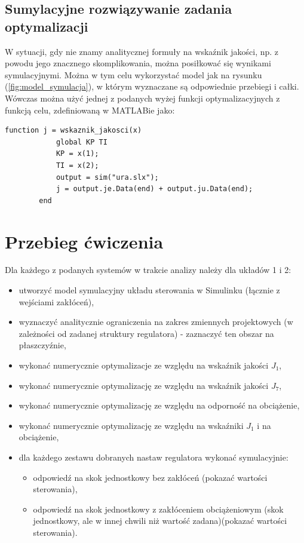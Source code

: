 \documentclass{article}
\begin{document}
    \subsection{Sumylacyjne rozwiązywanie zadania optymalizacji}
    W sytuacji, gdy nie znamy analitycznej formuły na wskaźnik jakości, np. z powodu jego znacznego skomplikowania, można posiłkować się wynikami symulacyjnymi.
    Można w tym celu wykorzystać model jak na rysunku (\ref{fig:model_symulacja}), w którym wyznaczane są odpowiednie przebiegi i całki.
    Wówczas można użyć jednej z podanych wyżej funkcji optymalizacyjnych z funkcją celu, zdefiniowaną w MATLABie jako:
    \begin{lstlisting}[style=Matlab-editor]
        function j = wskaznik_jakosci(x)
            global KP TI
            KP = x(1);
            TI = x(2);
            output = sim("ura.slx");
            j = output.je.Data(end) + output.ju.Data(end);
        end
    \end{lstlisting}

\section{Przebieg ćwiczenia}
Dla każdego z podanych systemów w trakcie analizy należy dla układów 1 i 2:
\begin{itemize}
    \item utworzyć model symulacyjny układu sterowania w Simulinku (łącznie z wejściami zakłóceń),
    \item wyznaczyć analitycznie ograniczenia na zakres zmiennych projektowych (w zależności od zadanej struktury regulatora) - zaznaczyć ten obszar na płaszczyźnie,
    \item wykonać numerycznie optymalizacje ze względu na wskaźnik jakości $J_{1}$,
    \item wykonać numerycznie optymalizację ze względu na wskaźnik jakości $J_{7}$,
    \item wykonać numerycznie optymalizację ze względu na odporność na obciążenie,
    \item wykonać numerycznie optymalizację ze względu na wskaźniki $J_{1}$  i na obciążenie,
    \item dla każdego zestawu dobranych nastaw regulatora wykonać symulacyjnie:
        \begin{itemize}
            \item odpowiedź na skok jednostkowy bez zakłóceń (pokazać wartości sterowania),
            \item odpowiedź na skok jednostkowy z zakłóceniem obciążeniowym (skok jednostkowy, ale w innej chwili niż wartość zadana)(pokazać wartości sterowania).
        \end{itemize}
\end{itemize}
\end{document}
